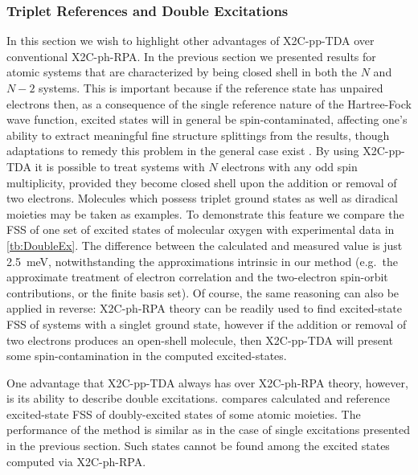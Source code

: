\subsubsection{Triplet References and Double Excitations}
\label{subsec:DoubleEx}
In this section we wish to highlight other advantages of X2C-pp-TDA over
conventional X2C-ph-RPA.  In the previous section we presented results for
atomic systems that are characterized by being closed shell in both the $N$ and
$N-2$ systems.  This is important because if the reference state has unpaired
electrons then, as a consequence of the single reference nature of the
Hartree-Fock wave function, excited states will in general be
spin-contaminated, affecting one's ability to extract meaningful fine structure
splittings from the results, though adaptations to remedy this problem in the 
general case exist \cite{Liu10_064106,Suo11_134101,Liu11_194106,Liu12_024107,Liu13_3741}. By
using X2C-pp-TDA it is possible to treat systems with $N$ electrons
with any odd spin multiplicity, provided they become closed shell upon the
addition or removal of two electrons.  Molecules which possess triplet ground
states as well as diradical moieties may be taken as examples.  To demonstrate
this feature we compare the FSS of one set of excited states of molecular
oxygen with experimental data in \cref{tb:DoubleEx}.  The difference between
the calculated and measured value is just 2.5~meV, notwithstanding the
approximations intrinsic in our method (e.g.~the approximate treatment of
electron correlation and the two-electron spin-orbit contributions, or the
finite basis set).  Of course, the same reasoning can also be applied in
reverse: X2C-ph-RPA theory can be readily used to find excited-state FSS of
systems with a singlet ground state, however if the addition or removal of two
electrons produces an open-shell molecule, then X2C-pp-TDA will present some
spin-contamination in the computed excited-states.



One advantage that X2C-pp-TDA always has over X2C-ph-RPA theory, however, is
its ability to describe double excitations.   compares
calculated and reference excited-state FSS of doubly-excited states of some
atomic moieties.  The performance of the method is similar as in the case of
single excitations presented in the previous section.  Such states cannot be
found among the excited states computed via X2C-ph-RPA.


